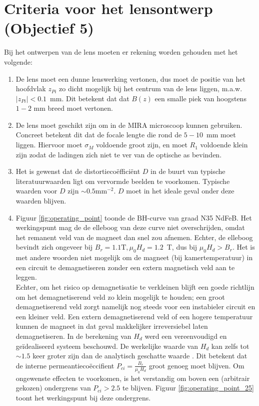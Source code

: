 \documentclass[we,twoside,openright,a4paper,11pt]{uantwerpenbamathesis}
\begin{document}
\section{Criteria voor het lensontwerp (Objectief 5)}\label{ch:lensontwerp}
Bij het ontwerpen van de lens moeten er rekening worden gehouden met het volgende:
\begin{enumerate}
    \item De lens moet een dunne lenswerking vertonen, dus moet de positie van het hoofdvlak $z_{Pi}$ zo dicht mogelijk bij het centrum van de lens liggen, m.a.w. $\left|z_{Pi}\right|<0.1$~mm. Dit betekent dat dat $B(z)$ een smalle piek van hoogstens $1-2$ mm breed moet vertonen.

    \item De lens moet geschikt zijn om in de MIRA microscoop kunnen gebruiken. Concreet betekent dit dat de focale lengte die rond de $5-10$~mm moet liggen. Hiervoor moet $\sigma_M$ voldoende groot zijn, en moet $R_1$ voldoende klein zijn zodat de ladingen zich niet te ver van de optische as bevinden.
    
    \item Het is gewenst dat de distortiecoëfficiënt $D$ in de buurt van typische literatuurwaarden ligt om vervormde beelden te voorkomen. Typische waarden voor $D$ zijn $\sim0.5\mathrm{mm}^{-2}$\cite{Abbas_2016}. $D$ moet in het ideale geval onder deze waarden blijven.

    \item Figuur \ref{fig:operating_point} toonde de $\mathrm{BH}$-curve van graad N35 NdFeB. Het werkingspunt mag de de elleboog van deze curve niet overschrijden, omdat het remanent veld van de magneet dan snel zou afnemen. Echter, de elleboog bevindt zich ongeveer bij $B_r=1.1\mathrm{T}, \mu_0 H_d = 1.2$~T, dus bij $\mu_0 H_d>B_r$. Het is met andere woorden niet mogelijk om de magneet (bij kamertemperatuur) in een circuit te demagnetiseren zonder een extern magnetisch veld aan te leggen.\\

    Echter, om het risico op demagnetisatie te verkleinen blijft een goede richtlijn om het demagnetiserend veld zo klein mogelijk te houden; een groot demagnetiserend veld zorgt namelijk nog steeds voor een instabieler circuit en een kleiner veld. Een extern demagnetiserend veld of een hogere temperatuur kunnen de magneet in dat geval makkelijker irreversiebel laten demagnetiseren. In de berekening van $H_d$ werd een vereenvoudigd en geïdealiseerd systeem beschouwd. De werkelijke waarde van $H_d$ kan zelfs tot $\sim1.5$ keer groter zijn dan de analytisch geschatte waarde \cite{MagnetFAQ}. Dit betekent dat de interne permeantiecoëccifient $P_{ci}=\frac{B_r}{\mu_0 H_d}$ groot genoeg moet blijven. Om ongewenste effecten te voorkomen, is het verstandig om boven een (arbitrair gekozen) ondergrens van $P_{ci}>2.5$ te blijven. Figuur \ref{fig:operating_point_25} toont het werkingspunt bij deze ondergrens.


\end{enumerate}
\end{document}
